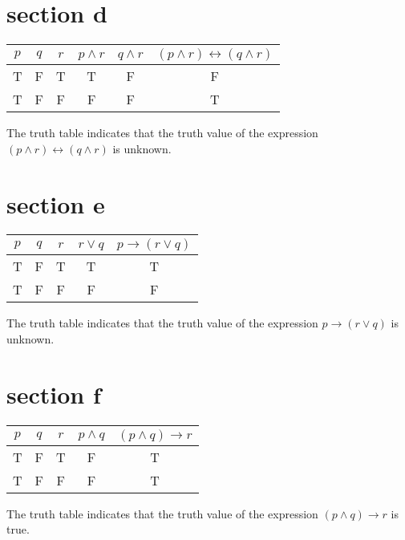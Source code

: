\documentclass[10pt]{article}
\begin{document}
\section*{section d}
\begin{center}
\begin{tabular}{|c|c|c|c|c|c|}
\hline
$p$ & $q$ & $r$ & $p \wedge r$ & $q \wedge r$ & $(p \wedge r) \leftrightarrow(q \wedge r)$ \\
\hline
T & F & T & T & F & F \\
\hline
T & F & F & F & F & T \\
\hline
\end{tabular}
\end{center}

The truth table indicates that the truth value of the expression $(p \wedge r) \leftrightarrow(q \wedge r)$ is unknown.

\section*{section e}
\begin{center}
\begin{tabular}{|c|c|c|c|c|}
\hline
$p$ & $q$ & $r$ & $r \vee q$ & $p \rightarrow(r \vee q)$ \\
\hline
T & F & T & T & T \\
\hline
T & F & F & F & F \\
\hline
\end{tabular}
\end{center}

The truth table indicates that the truth value of the expression $p \rightarrow(r \vee q)$ is unknown.

\section*{section $\mathbf{f}$}
\begin{center}
\begin{tabular}{|c|c|c|c|c|}
\hline
$p$ & $q$ & $r$ & $p \wedge q$ & $(p \wedge q) \rightarrow r$ \\
\hline
T & F & T & F & T \\
\hline
T & F & F & F & T \\
\hline
\end{tabular}
\end{center}

The truth table indicates that the truth value of the expression $(p \wedge q) \rightarrow r$ is true.
\end{document}
